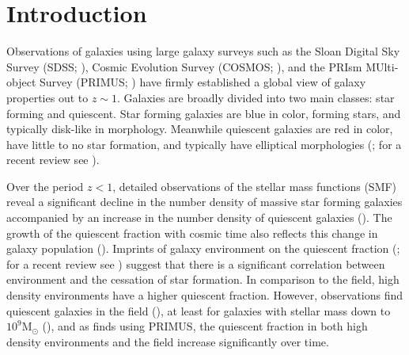 \section{Introduction}
Observations of galaxies using large galaxy surveys such as the 
Sloan Digital Sky Survey (SDSS; \citealt{York:2000aa}), 
Cosmic Evolution Survey (COSMOS; \citealt{Scoville:2007aa}), 
and the PRIsm MUlti-object Survey (PRIMUS;  \citealt{Coil:2011aa, Cool:2013aa}) 
have firmly established a global view of galaxy properties out to $z \sim 1$. 
Galaxies are broadly divided into two main classes: star forming and quiescent. 
Star forming galaxies are blue in color, forming stars, and typically 
disk-like in morphology. Meanwhile quiescent galaxies are red in color, 
have little to no star formation, and typically have elliptical morphologies 
(\citealt{Kauffmann:2003aa, Blanton:2003aa, Baldry:2006aa, 
Wyder:2007aa, Moustakas:2013aa}; for a recent review see \citealt{Blanton:2009aa}). 


Over the period $z < 1$, detailed observations of the stellar 
mass functions (SMF) reveal a significant decline in the number density 
of massive star forming galaxies accompanied by an increase in the 
number density of quiescent galaxies 
(\citealt{Blanton:2006aa, Borch:2006aa, Bundy:2006aa, Moustakas:2013aa}). 
The growth of the quiescent fraction with cosmic time also reflects 
this change in galaxy population 
(\citealt{Peng:2010aa, Tinker:2013aa, Hahn:2015aa}). 
Imprints of galaxy environment on the quiescent fraction 
(\citealt{Hubble:1936aa, Oemler:1974aa, Dressler:1980aa, Hermit:1996aa}; 
for a recent review see \citealt{Blanton:2009aa}) suggest that there 
is a significant correlation between environment and the 
cessation of star formation. In comparison to the field, high density 
environments have a higher quiescent fraction.
However, observations find quiescent galaxies in the field 
(\citealt{Baldry:2006aa,Tinker:2011aa,Geha:2012aa}), 
at least for galaxies with stellar mass down to 
$10^9\mathrm{M}_\odot$ (\citealt{Geha:2012aa}), and as 
\cite{Hahn:2015aa} finds using PRIMUS, the quiescent fraction in 
both high density environments and the field increase significantly 
over time. 

